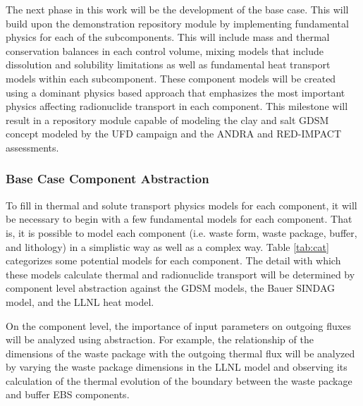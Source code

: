 
The next phase in this work will be the development of the base case. This will 
build upon the demonstration repository module by implementing fundamental 
physics for each of the subcomponents. This will include mass and thermal 
conservation balances in each control volume, mixing models that include 
dissolution and solubility limitations as well as fundamental heat transport
models within each subcomponent. These component models will be created using a 
dominant physics based approach that emphasizes the most important physics 
affecting radionuclide transport in each component. This milestone will result 
in a repository module capable of modeling the clay and salt \gls{GDSM} concept 
modeled by the \gls{UFD} campaign and the \gls{ANDRA} and RED-IMPACT  assessments.

\subsubsection{Base Case Component Abstraction}


To fill in thermal and solute transport physics models for each component, it 
will be necessary to begin with a few fundamental models for each component. 
That is, it is possible to model each component (i.e. waste form, waste package, 
buffer, and lithology) in a simplistic way as well as a complex way. Table 
\ref{tab:cat} categorizes some potential models for each component. The detail 
with which these models calculate thermal and radionuclide transport will be 
determined by component level abstraction against the \gls{GDSM} models, the 
Bauer \gls{SINDAG} model, and the \gls{LLNL} heat model.


  


On the component level, the importance of input parameters on outgoing fluxes 
will be analyzed using abstraction. For example, the relationship of the 
dimensions  of the waste package with the outgoing thermal flux 
will be analyzed by varying the waste package dimensions in the \gls{LLNL} 
model and observing its calculation of the thermal evolution of the boundary 
between the waste package and buffer \gls{EBS} components.

